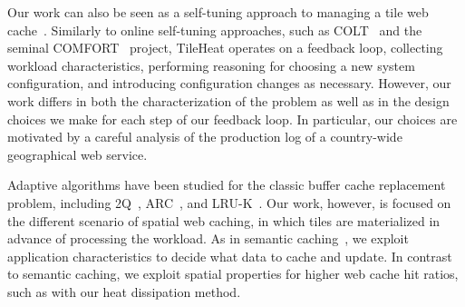 \documentclass[11pt, oneside]{report}
\begin{document}
{Our work can also be seen as a self-tuning approach to managing a tile web cache~\cite{CN07:SelfTuning10YrPaper}. Similarly to online self-tuning approaches, such as COLT~\cite{SAMP07:COLT} and the seminal COMFORT~\cite{WHMZ94:COMFORT} project, TileHeat operates on a feedback loop, collecting workload characteristics, performing reasoning for choosing a new system configuration, and introducing configuration changes as necessary. However, our work differs in both the characterization of the problem as well as in the design choices we make for each step of our feedback loop. 
In particular, our choices are motivated by a careful analysis of the production log of a country-wide geographical web service. 

Adaptive algorithms have been studied for the classic buffer cache replacement problem, including 2Q~\cite{JS94:2Q}, ARC~\cite{MM03:ARC}, and LRU-K~\cite{OOW93:LRU-K}. Our work, however, is focused on the different scenario of spatial web caching, in which tiles are materialized in advance of processing the workload.
As in semantic caching~\cite{DFJ+96:SemanticCaching}, we exploit application characteristics to decide what data to cache and update. In contrast to semantic caching, we exploit spatial properties for higher web cache hit ratios, such as with our heat dissipation method. 
	
}
\end{document}

